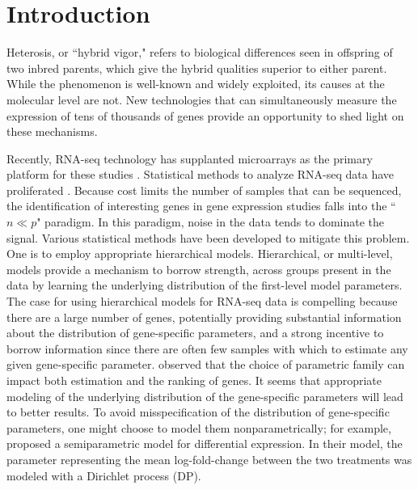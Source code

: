\section{Introduction}
Heterosis, or ``hybrid vigor," refers to biological differences seen in offspring of two inbred parents, which give the hybrid qualities superior to either parent. While the phenomenon is well-known and widely exploited, its causes at the molecular level are not\citep{paschold}. New technologies that can simultaneously measure the expression of tens of thousands of genes provide an opportunity to shed light on these mechanisms.

Recently, RNA-seq technology has supplanted microarrays as the primary platform for these studies \citep{wang2009rna}. Statistical methods to analyze RNA-seq data have proliferated \citep{voom,deseq2014,mccarthy,liu,landau}. Because cost limits the number of samples that can be sequenced, the identification of interesting genes in gene expression studies falls into the ``$n \ll p$" paradigm. In this paradigm, noise in the data tends to dominate the signal. Various statistical methods have been developed to mitigate this problem. One is to employ appropriate hierarchical models. Hierarchical, or multi-level, models provide a mechanism to borrow strength, across groups present in the data by learning the underlying distribution of the first-level model parameters. The case for using hierarchical models for RNA-seq data is compelling because there are a large number of genes, potentially providing substantial information about the distribution of gene-specific parameters, and a strong incentive to borrow information since there are often few samples with which to estimate any given gene-specific parameter. \citet{niemi} observed that the choice of parametric family can impact both estimation and the ranking of genes. It seems that appropriate modeling of the underlying distribution of the gene-specific parameters will lead to better results. To avoid misspecification of the distribution of gene-specific parameters, one might choose to model them nonparametrically; for example, \citet{liu} proposed a semiparametric model for differential expression. In their model, the parameter representing the mean log-fold-change between the two treatments was modeled with a Dirichlet process (DP).

